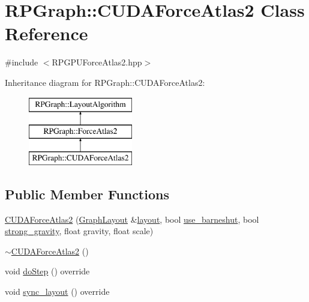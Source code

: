 \hypertarget{classRPGraph_1_1CUDAForceAtlas2}{}\section{R\+P\+Graph\+:\+:C\+U\+D\+A\+Force\+Atlas2 Class Reference}
\label{classRPGraph_1_1CUDAForceAtlas2}


{\ttfamily \#include $<$R\+P\+G\+P\+U\+Force\+Atlas2.\+hpp$>$}

Inheritance diagram for R\+P\+Graph\+:\+:C\+U\+D\+A\+Force\+Atlas2\+:\begin{figure}[H]
\begin{center}
\leavevmode
\includegraphics[height=3.000000cm]{classRPGraph_1_1CUDAForceAtlas2}
\end{center}
\end{figure}
\subsection*{Public Member Functions}
\begin{DoxyCompactItemize}
\item 
\mbox{\hyperlink{classRPGraph_1_1CUDAForceAtlas2_a8cdd430ec7758697fe362cfbca2fd311}{C\+U\+D\+A\+Force\+Atlas2}} (\mbox{\hyperlink{classRPGraph_1_1GraphLayout}{Graph\+Layout}} \&\mbox{\hyperlink{classRPGraph_1_1LayoutAlgorithm_ac2335a7ccaeb6cef789ea59b99353cf9}{layout}}, bool \mbox{\hyperlink{classRPGraph_1_1ForceAtlas2_a6ca74377ba79a67e4d1660c61426c090}{use\+\_\+barneshut}}, bool \mbox{\hyperlink{classRPGraph_1_1ForceAtlas2_afabfd0d83e05a54de889a62d0ff7595e}{strong\+\_\+gravity}}, float gravity, float scale)
\item 
\mbox{\hyperlink{classRPGraph_1_1CUDAForceAtlas2_a5a57cb10f336ced8b717dbfa16cc4051}{$\sim$\+C\+U\+D\+A\+Force\+Atlas2}} ()
\item 
void \mbox{\hyperlink{classRPGraph_1_1CUDAForceAtlas2_a4ebfb858b5c2c19b9e57ef1d434a21a7}{do\+Step}} () override
\item 
void \mbox{\hyperlink{classRPGraph_1_1CUDAForceAtlas2_a474a1cd717352057859185885b8020cf}{sync\+\_\+layout}} () override
\end{DoxyCompactItemize}
